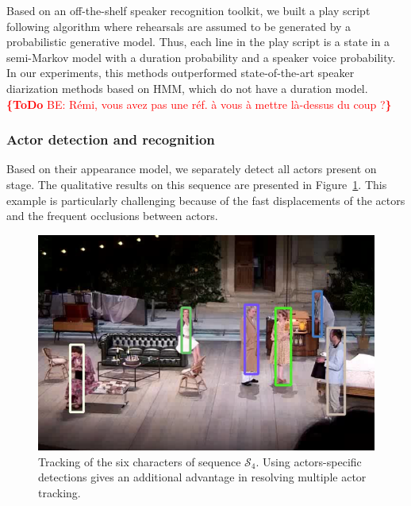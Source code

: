 \documentclass[conference]{IEEEtran}
\newcommand{\todo}[1]{\noindent\textcolor{red}{{\bf \{ToDo} #1{\bf \}}}}
\begin{document}
Based on an off-the-shelf speaker recognition toolkit, we built a play script following algorithm where rehearsals are assumed to be generated by a probabilistic generative model.  Thus, each  line in the play script is a state in a semi-Markov model with a duration probability and a speaker voice probability. In our experiments, this methods outperformed state-of-the-art speaker diarization methods based on HMM, which do not have a duration model.
\todo{BE: Rémi, vous avez pas une réf. à vous à mettre là-dessus du coup ?}



\subsubsection{Actor detection and recognition} 

Based on their appearance model, we separately detect all actors present on stage. The qualitative results on this sequence are presented in Figure~\ref{fig_tracking_coahtr}. This example is particularly challenging  because of the fast displacements of the actors and the frequent occlusions between actors. 

\begin{figure}[tp]
\centering
\includegraphics[width=\columnwidth]{tracking_coahtr}
\caption{Tracking of  the six characters of sequence $\mathcal{S}_4$. Using actors-specific detections gives an additional advantage in resolving multiple actor tracking.}
\label{fig_tracking_coahtr}
\end{figure}
\end{document}
